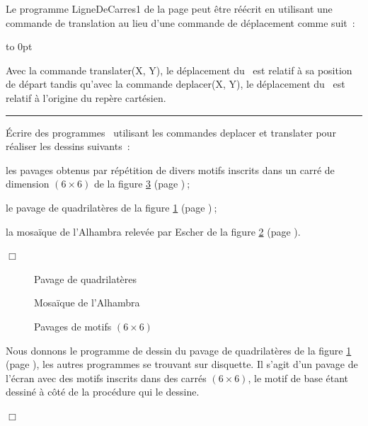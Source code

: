 Le programme {\idt LigneDeCarres1} de la page
\pageref{prog:LigneDeCarres1} peut être réécrit en uti\-li\-sant une
commande de translation au lieu d'une commande de dé\-pla\-ce\-ment
com\-me suit~:\\
{\raggedright%
\vspace{\baselineskip}%
\vbox to 0pt{\vspace*{\baselineskip}\vspace*{6cm}%
}%
\vspace*{-1cm}%

}
 
 Avec la commande {\idt translater(X, Y)}, le déplacement du \robot\ est relatif à sa position de
départ tandis qu'avec la commande {\idt deplacer(X, Y)}, le déplacement du \robot\ est relatif 
à l'origine du repère cartésien.
 
\noindent \rule{137mm}{0.1mm} %
\begin{exercices}{Écrire des programmes \pascal\  utilisant les commandes
{\idt de\-pla\-cer} et {\idt translater} pour réaliser les dessins suivants~:

\tiret  les pavages obtenus par répétition de divers motifs inscrits dans un carré de
dimension $(6 \times 6)$ de la figure \ref{fig:pm6x6} (page \pageref{fig:pm6x6})$\:$;

\tiret  le pavage de quadrilatères de la figure \ref{fig:pavqua} (page \pageref{fig:pavqua})$\:$;

\tiret  la mosaïque de l'Alhambra relevée par Escher \cite{escher1} de la figure 
\ref{fig:mosa5} (page \pageref{fig:mosa5}).

\noindent $\Box$}\end{exercices}
\begin{figure}[htbp]
 \caption{Pavage de quadrilatères}\label{fig:pavqua}
\end{figure}
\begin{figure}[htbp]
 \caption{Mosaïque de l'Alhambra}\label{fig:mosa5}
\end{figure}
\begin{figure}[htbp]
 \caption{Pavages de motifs $(6 \times 6)$}\label{fig:pm6x6}
\end{figure}
\begin{corrige}{
Nous donnons le programme de dessin du pavage de quadrilatères de la figure \ref{fig:pavqua} (page 
\pageref{fig:pavqua}), les autres programmes se trouvant sur disquette. Il s'agit d'un pavage de
l'écran avec des motifs inscrits dans des carrés $(6 \times 6)$, le motif de base étant
dessiné à côté de la procédure qui le dessine.

\noindent $\Box$}\end{corrige}

